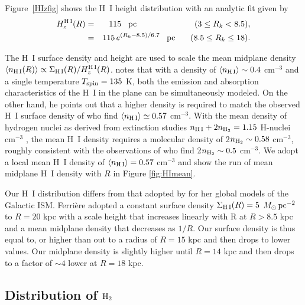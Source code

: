 \documentclass[12pt,preprint,flushrt]{aastex}
\begin{document}
Figure~\ref{HIzfig} shows the H~I height distribution
with an analytic fit given by
\begin{eqnarray}
H_z^{\rm H\, I}(R) & = & 115 \,\,\,\,\, {\rm pc} \,\,\,\,\,
   \,\,\,\,\,~~~~~~~~~~~~~~~~  (3\le R_k < 8.5),\\
 & = & 115\,e^{(R_k-8.5)/6.7} \,\,\,\,\, {\rm pc}\,\,\,\,\,
    \,\,\,\,\,\, (8.5\le R_k \le 18).
\label{eq:hiz}
\end{eqnarray}

The H~I surface density and height are used to scale the
mean midplane density $\langle n_{\rm H\,I}(R)\rangle
\propto \Sigma_{\rm H\,I} (R)/H_z^{\rm H\,I}(R)$. \cite{lis92} notes
that with a density of 
$\langle n_{\rm H\,I} \rangle\sim 0.4$ cm$^{-3}$ and a
single temperature
$T_{\rm spin} = 135$ K, both the emission and absorption characteristics
of the H~I in the plane can be simultaneously modeled.
On the other hand, he points out that a higher density is
required to match the observed H~I surface density of \cite{dic90}
who find  $\langle n_{\rm H\,I} \rangle\simeq 0.57$
cm$^{-3}$. With the mean density of hydrogen nuclei
as derived from extinction studies
$n_{\rm H\,I} + 2n_{{\rm H_2}}= 1.15$ H-nuclei
cm$^{-3}$ \citep{boh78}, the \cite{dic90} mean H~I density
requires a molecular density of 2$n_{{\rm H_2}}\sim 0.58$ cm$^{-3}$,
roughly consistent with the observations of \cite{bro88} who find
2$n_{{\rm H_2}}\sim 0.5$ cm$^{-3}$.  We adopt a local mean 
H~I density of  $\langle n_{\rm H\,I} \rangle =0.57$ cm$^{-3}$ 
and show the run of mean
midplane H~I density with $R$ in Figure \ref{fig:HImean}.

Our H~I distribution differs from that adopted by \cite{fer98} for her
global models of the Galactic ISM. Ferri\`ere  adopted a constant surface
density $\Sigma_{\rm H\,I}(R)  = 5$ $M_\odot \, {\rm pc}^{-2}$
to $R=20$ kpc with a scale height that increases linearly
with R at $R > 8.5$ kpc and a mean midplane density that decreases
as $1/R$. Our surface density is thus equal to, or higher than \cite{fer98}
out to a radius of $R=15$ kpc and then drops to lower values. Our
midplane density is slightly higher until $R=14$ kpc and then
drops to a factor of $\sim 4$ lower at $R=18$ kpc.

\subsection{Distribution of ${\rm H_2}$}
\label{sub:H2}
\end{document}
